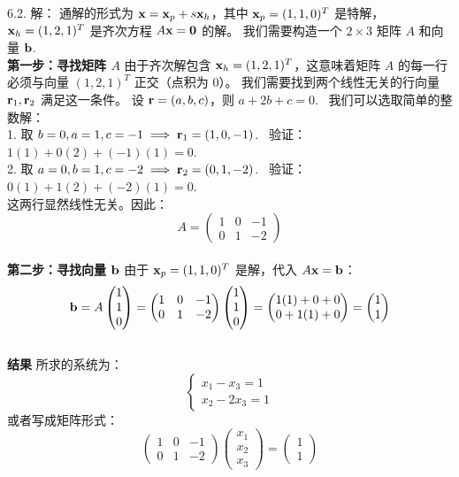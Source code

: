 \begin{exer}
6.2. 解：
通解的形式为 $\mathbf{x} = \mathbf{x}_p + s \mathbf{x}_h$，其中 $\mathbf{x}_p = (1, 1, 0)^T$ 是特解，$\mathbf{x}_h = (1, 2, 1)^T$ 是齐次方程 $A\mathbf{x} = \mathbf{0}$ 的解。
我们需要构造一个 $2 \times 3$ 矩阵 $A$ 和向量 $\mathbf{b}$.~
\\
\textbf{第一步：寻找矩阵 $A$}
由于齐次解包含 $\mathbf{x}_h = (1, 2, 1)^T$，这意味着矩阵 $A$ 的每一行必须与向量 $(1, 2, 1)^T$ 正交（点积为 0）。
我们需要找到两个线性无关的行向量 $\mathbf{r}_1, \mathbf{r}_2$ 满足这一条件。
设 $\mathbf{r} = (a, b, c)$，则 $a + 2b + c = 0$.~
我们可以选取简单的整数解：\\
1. 取 $b=0, a=1, c=-1 \implies \mathbf{r}_1 = (1, 0, -1)$.~
验证：$1(1) + 0(2) + (-1)(1) = 0$.~\\
2. 取 $a=0, b=1, c=-2 \implies \mathbf{r}_2 = (0, 1, -2)$.~
验证：$0(1) + 1(2) + (-2)(1) = 0$.~\\
这两行显然线性无关。因此：
$$ A = \begin{pmatrix} 1 & 0 & -1 \\ 0 & 1 & -2 \end{pmatrix} $$
\\
\textbf{第二步：寻找向量 $\mathbf{b}$}
由于 $\mathbf{x}_p = (1, 1, 0)^T$ 是解，代入 $A\mathbf{x} = \mathbf{b}$：
$$ \mathbf{b} = A \begin{pmatrix} 1 \\ 1 \\ 0 \end{pmatrix} = \begin{pmatrix} 1 & 0 & -1 \\ 0 & 1 & -2 \end{pmatrix} \begin{pmatrix} 1 \\ 1 \\ 0 \end{pmatrix} = \begin{pmatrix} 1(1) + 0 + 0 \\ 0 + 1(1) + 0 \end{pmatrix} = \begin{pmatrix} 1 \\ 1 \end{pmatrix} $$
\\
\textbf{结果}
所求的系统为：
$$ \begin{cases} x_1 - x_3 = 1 \\ x_2 - 2x_3 = 1 \end{cases} $$
或者写成矩阵形式：
$$ \begin{pmatrix} 1 & 0 & -1 \\ 0 & 1 & -2 \end{pmatrix} \begin{pmatrix} x_1 \\ x_2 \\ x_3 \end{pmatrix} = \begin{pmatrix} 1 \\ 1 \end{pmatrix} $$


\end{exer}
